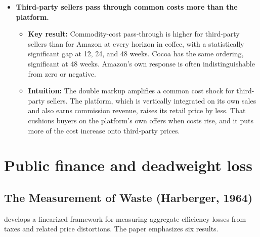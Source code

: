 \documentclass[11pt]{article}
\begin{document}
\begin{itemize}
    \item \textbf{Third-party sellers pass through common costs more than the platform.}
    \begin{itemize}
        \item \textbf{Key result:} Commodity-cost pass-through is higher for
        third-party sellers than for Amazon at every horizon in coffee, with
        a statistically significant gap at 12, 24, and 48 weeks.  Cocoa has
        the same ordering, significant at 48 weeks.  Amazon's own response is
        often indistinguishable from zero or negative.
        \item \textbf{Intuition:} The double markup amplifies a common cost
        shock for third-party sellers.  The platform, which is vertically
        integrated on its own sales and also earns commission revenue, raises
        its retail price by less.  That cushions buyers on the platform's own
        offers when costs rise, and it puts more of the cost increase onto
        third-party prices.
    \end{itemize}
\end{itemize}

\section{Public finance and deadweight loss}

\subsection{The Measurement of Waste (Harberger, 1964)}

\citet{harberger_measurement_1964} develops a linearized framework for measuring
aggregate efficiency losses from taxes and related price distortions.  The paper
emphasizes six results.
\end{document}
